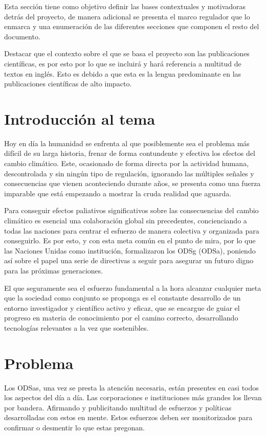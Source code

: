 Esta sección tiene como objetivo definir las bases contextuales y motivadoras
detrás del proyecto, de manera adicional se presenta el marco regulador que lo
enmarca y una enumeración de las diferentes secciones que componen el resto del
documento.

Destacar que el contexto sobre el que se basa el proyecto son las publicaciones
científicas, es por esto por lo que se incluirá y hará referencia a multitud de
textos en inglés. Esto es debido a que esta es la lengua predominante en las
publicaciones científicas de alto impacto.

\section{Introducción al tema}
Hoy en día la humanidad se enfrenta al que posiblemente sea el problema más
difícil de su larga historia, frenar de forma contundente y efectiva los efectos
del cambio climático. Este, ocasionado de forma directa por la actividad
humana, descontrolada y sin ningún tipo de regulación, ignorando las múltiples
señales y consecuencias que vienen aconteciendo durante años, se presenta como
una fuerza imparable que está empezando a mostrar la cruda realidad que aguarda.

Para conseguir efectos paliativos significativos sobre las consecuencias del
cambio climático es esencial una colaboración global sin precedentes,
concienciando a todas las naciones para centrar el esfuerzo de manera colectiva
y organizada para conseguirlo. Es por esto, y con esta meta común en el punto de
mira, por lo que las Naciones Unidas como institución, formalizaron los
\gls{ODSg} (\gls{ODSa}), poniendo así sobre el papel una serie de
directivas a seguir para asegurar un futuro digno para las próximas
generaciones.

El que seguramente sea el esfuerzo fundamental a la hora alcanzar cualquier meta
que la sociedad como conjunto se proponga es el constante desarrollo de un
entorno investigador y científico activo y eficaz, que se encargue de guiar el
progreso en materia de conocimiento por el camino correcto, desarrollando
tecnologías relevantes a la vez que sostenibles.

\section{Problema}
Los \gls{ODSa}s, una vez se presta la atención
necesaria, están presentes en casi todos los aspectos del día a día. Las
corporaciones e instituciones más grandes los llevan por bandera. Afirmando y
publicitando multitud de esfuerzos y políticas desarrolladas con estos en mente.
Estos esfuerzos deben ser monitorizados para confirmar o desmentir lo que estas
pregonan.

